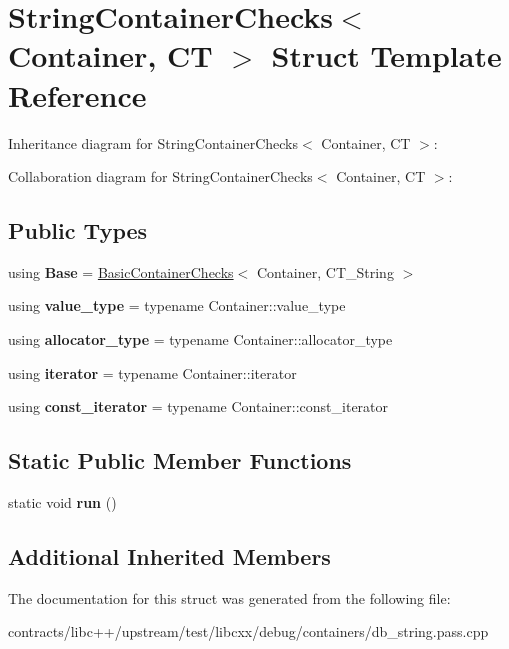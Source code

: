 \hypertarget{struct_string_container_checks}{}\section{String\+Container\+Checks$<$ Container, CT $>$ Struct Template Reference}
\label{struct_string_container_checks}


Inheritance diagram for String\+Container\+Checks$<$ Container, CT $>$\+:


Collaboration diagram for String\+Container\+Checks$<$ Container, CT $>$\+:
\subsection*{Public Types}
\begin{DoxyCompactItemize}
\item 
\mbox{\label{struct_string_container_checks_a27f2e09de15b8a63b3171631f0ced20e}} 
using {\bfseries Base} = \mbox{\hyperlink{struct_iterator_debug_checks_1_1_basic_container_checks}{Basic\+Container\+Checks}}$<$ Container, C\+T\+\_\+\+String $>$
\item 
\mbox{\label{struct_string_container_checks_a3454d7a258265d2010e0494c73a25ccf}} 
using {\bfseries value\+\_\+type} = typename Container\+::value\+\_\+type
\item 
\mbox{\label{struct_string_container_checks_a0fe1802a4dd3580db28816db7010caec}} 
using {\bfseries allocator\+\_\+type} = typename Container\+::allocator\+\_\+type
\item 
\mbox{\label{struct_string_container_checks_adb516a61630732564e9e7d48ea69e47d}} 
using {\bfseries iterator} = typename Container\+::iterator
\item 
\mbox{\label{struct_string_container_checks_a934bce0c3921590a9e4d756eecfae0d7}} 
using {\bfseries const\+\_\+iterator} = typename Container\+::const\+\_\+iterator
\end{DoxyCompactItemize}
\subsection*{Static Public Member Functions}
\begin{DoxyCompactItemize}
\item 
\mbox{\label{struct_string_container_checks_aa07c1733a9b6a01233b5a97f914c1b1c}} 
static void {\bfseries run} ()
\end{DoxyCompactItemize}
\subsection*{Additional Inherited Members}


The documentation for this struct was generated from the following file\+:\begin{DoxyCompactItemize}
\item 
contracts/libc++/upstream/test/libcxx/debug/containers/db\+\_\+string.\+pass.\+cpp\end{DoxyCompactItemize}
